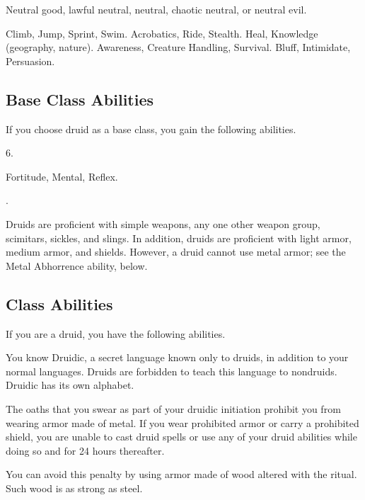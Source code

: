      Neutral good, lawful neutral, neutral, chaotic neutral, or neutral evil.

     Climb, Jump, Sprint, Swim.
     Acrobatics, Ride, Stealth.
     Heal, Knowledge (geography, nature).
     Awareness, Creature Handling, Survival.
     Bluff, Intimidate, Persuasion.

    \subsection{Base Class Abilities}
        If you choose druid as a base class, you gain the following abilities.

         6.

          Fortitude,  Mental,  Reflex.

         .

        Druids are proficient with simple weapons, any one other weapon group, scimitars, sickles, and slings.
        In addition, druids are proficient with light armor, medium armor, and shields.
        However, a druid cannot use metal armor; see the Metal Abhorrence ability, below.

    \subsection{Class Abilities}
        If you are a druid, you have the following abilities.

        You know Druidic, a secret language known only to druids, in addition to your normal languages.
        Druids are forbidden to teach this language to nondruids.
        Druidic has its own alphabet.

        The oaths that you swear as part of your druidic initiation prohibit you from wearing armor made of metal.
        If you wear prohibited armor or carry a prohibited shield, you are unable to cast druid spells or use any of your  druid abilities while doing so and for 24 hours thereafter.
        
        You can avoid this penalty by using armor made of wood altered with the  ritual.
        Such wood is as strong as steel.

